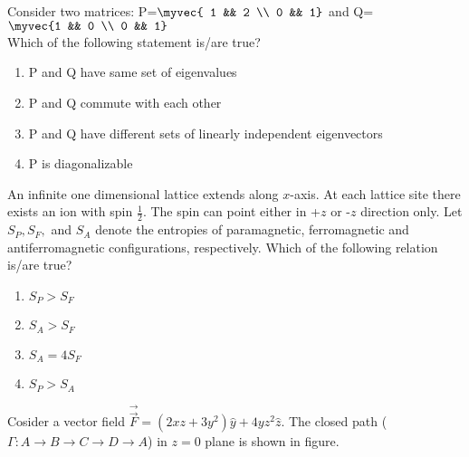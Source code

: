     \item Consider two matrices: P=$\myvec{ 1 && 2 \\ 0 && 1}$ and Q=$\myvec{1 && 0 \\ 0 && 1}$ \\
    Which of the following statement is/are true?
    \begin{enumerate}
        \item P and Q have same set of eigenvalues
        \item P and Q commute with each other
        \item P and Q have different sets of linearly independent eigenvectors
        \item P is diagonalizable
    \end{enumerate}
    \item An infinite one dimensional lattice extends along $x$-axis. At each lattice site there
exists an ion with spin $\frac{1}{2}$. The spin can point either in +$z$ or -$z$ direction only. Let
$S_P, S_F,$ and $S_A$ denote the entropies of paramagnetic, ferromagnetic and
antiferromagnetic configurations, respectively. Which of the following relation is/are true?
\begin{enumerate}
    \item $S_P>S_F$
    \item $S_A>S_F$
    \item $S_A=4S_F$
    \item $S_P>S_A$
\end{enumerate}
\item Cosider a vector field $\Vec{\overrightarrow{F}}=(2xz+3y^2)\hat{y}+4yz^2\hat{z}$. The closed path 
($\Gamma:A\rightarrow B\rightarrow C\rightarrow D\rightarrow A$) in $z=0$ plane is shown in figure. \\
\begin{figure}[H]
    \centering
\begin{figure}[H]
\centering
{}%

\end{figure}
\end{figure}

